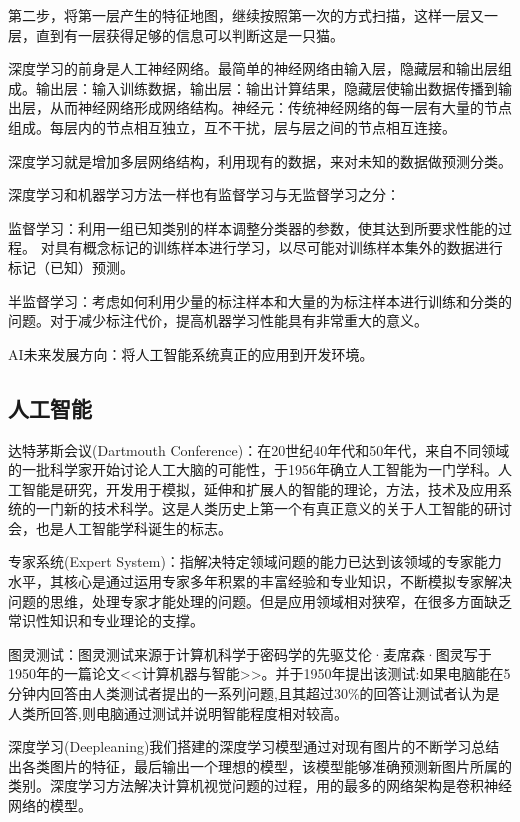 \documentclass[openbib]{article}
\begin{document}
	第二步，将第一层产生的特征地图，继续按照第一次的方式扫描，这样一层又一层，直到有一层获得足够的信息可以判断这是一只猫。
	
	深度学习的前身是人工神经网络。最简单的神经网络由输入层，隐藏层和输出层组成。输出层：输入训练数据，输出层：输出计算结果，隐藏层使输出数据传播到输出层，从而神经网络形成网络结构。神经元：传统神经网络的每一层有大量的节点组成。每层内的节点相互独立，互不干扰，层与层之间的节点相互连接。
	
	深度学习就是增加多层网络结构，利用现有的数据，来对未知的数据做预测分类。
	
	深度学习和机器学习方法一样也有监督学习与无监督学习之分：
	
	监督学习：利用一组已知类别的样本调整分类器的参数，使其达到所要求性能的过程。
	对具有概念标记的训练样本进行学习，以尽可能对训练样本集外的数据进行标记（已知）预测。
	
	半监督学习：考虑如何利用少量的标注样本和大量的为标注样本进行训练和分类的问题。对于减少标注代价，提高机器学习性能具有非常重大的意义。
	
	AI未来发展方向：将人工智能系统真正的应用到开发环境。
	
	\subsection{人工智能}
	
	达特茅斯会议(Dartmouth Conference)：在20世纪40年代和50年代，来自不同领域的一批科学家开始讨论人工大脑的可能性，于1956年确立人工智能为一门学科。人工智能是研究，开发用于模拟，延伸和扩展人的智能的理论，方法，技术及应用系统的一门新的技术科学。这是人类历史上第一个有真正意义的关于人工智能的研讨会，也是人工智能学科诞生的标志。
	
	专家系统(Expert System)：指解决特定领域问题的能力已达到该领域的专家能力水平，其核心是通过运用专家多年积累的丰富经验和专业知识，不断模拟专家解决问题的思维，处理专家才能处理的问题。但是应用领域相对狭窄，在很多方面缺乏常识性知识和专业理论的支撑。
	
	图灵测试：图灵测试来源于计算机科学于密码学的先驱艾伦·麦席森·图灵写于1950年的一篇论文<<计算机器与智能>>。并于1950年提出该测试:如果电脑能在5分钟内回答由人类测试者提出的一系列问题,且其超过30\%的回答让测试者认为是人类所回答,则电脑通过测试并说明智能程度相对较高。
	
	
	
	深度学习(Deepleaning)我们搭建的深度学习模型通过对现有图片的不断学习总结出各类图片的特征，最后输出一个理想的模型，该模型能够准确预测新图片所属的类别。深度学习方法解决计算机视觉问题的过程，用的最多的网络架构是卷积神经网络的模型。
	
\end{document}
